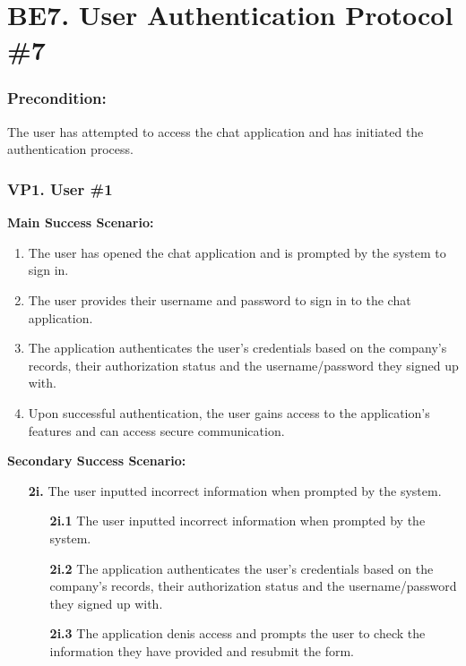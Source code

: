 \documentclass[]{article}
\begin{document}
\section*{BE7. User Authentication Protocol \#7}
\subsubsection*{Precondition:} The user has attempted to access the chat application and has initiated the authentication process.
\subsubsection*{VP1. User \#1}
\textbf{Main Success Scenario:}
\begin{enumerate}
	\item The user has opened the chat application and is prompted by the system to sign in.
	\item The user provides their username and password to sign in to the chat application.
	\item The application authenticates the user's credentials based on the company's records, their authorization status and the username/password they signed up with.
	\item Upon successful authentication, the user gains access to the application's features and can access secure communication.
\end{enumerate}
\textbf{Secondary Success Scenario:}
\begin{enumerate}
	\item[\textbf{2i.}] The user inputted incorrect information when prompted by the system.
		\begin{enumerate}
			\item[\textbf{2i.1}] The user inputted incorrect information when prompted by the system.
			\item[\textbf{2i.2}] The application authenticates the user's credentials based on the company's records, their authorization status and the username/password they signed up with.
			\item[\textbf{2i.3}] The application denis access and prompts the user to check the information they have provided and resubmit the form.
		\end{enumerate}
\end{enumerate}
\end{document}
